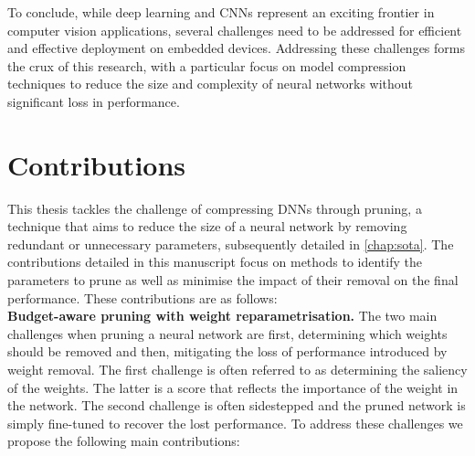 To conclude, while deep learning and CNNs represent an exciting frontier in
computer vision applications, several challenges need to be addressed for
efficient and effective deployment on embedded devices. Addressing these
challenges forms the crux of this research, with a particular focus on model
compression techniques to reduce the size and complexity of neural networks
without significant loss in performance.\\


\section{Contributions}

This thesis tackles the challenge of compressing \acp{DNN} through pruning, a
technique that aims to reduce the size of a neural network by removing redundant
or unnecessary parameters, subsequently detailed in \cref{chap:sota}. The
contributions detailed in this manuscript focus on methods to identify the
parameters to prune as well as minimise the impact of their removal on the final
performance. These contributions are as follows:\\

\noindent \textbf{Budget-aware pruning with weight reparametrisation.} The two
main challenges when pruning a neural network are first, determining which
weights should be removed and then, mitigating the loss of performance
introduced by weight removal. The first challenge is often referred to as
determining the saliency of the weights. The latter is a score that reflects the
importance of the weight in the network. The second challenge is often
sidestepped and the pruned network is simply fine-tuned to recover the lost
performance. To address these challenges we propose the following main
contributions:

